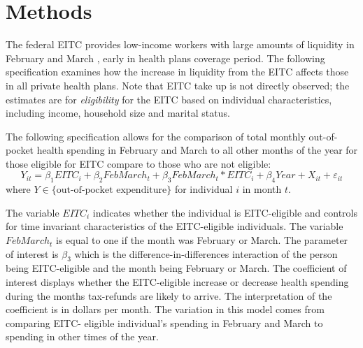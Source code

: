 \documentclass[smallcondensed,referee]{svjour3}
\begin{document}
\newpage





\FloatBarrier
\section{Methods}


\FloatBarrier
 


The federal EITC provides low-income workers with large amounts of liquidity in February and March \citep{mendenhall_role_2012, hamad_short-term_2019}, early in health plans coverage period.
 The following specification examines how the increase in liquidity from the EITC affects those in all private health plans. Note that EITC take up is not directly observed; the estimates are for \textit{eligibility} for the EITC based on individual characteristics, including income, household size and marital status. 

The following specification allows for the comparison of total monthly out-of-pocket health spending  in February and March to all other months of the year for those eligible for EITC compare to those who are not eligible:
\begin{equation}
Y_{it} =  \beta_{1}EITC_{i} +\beta_{2}FebMarch_{t} +\beta_{3}FebMarch_{t}*EITC_{i} + 
 \beta_{4}Year + X_{it}+\varepsilon_{it}  \label{eq:1} 
\end{equation}
where $Y \in \{\text{out-of-pocket expenditure}\}$ for individual $i$ in month $t$.



The variable $EITC_{i}$ indicates whether the individual is EITC-eligible and controls for time invariant characteristics of the EITC-eligible individuals. The variable $FebMarch_{t}$ is equal to one if the month was February or March. The parameter of interest is $\beta_{3}$ which is the difference-in-differences  interaction of the person being EITC-eligible and the month being February or March. The coefficient of interest displays whether the EITC-eligible increase or decrease health spending during the months tax-refunds are likely to arrive. The interpretation of the coefficient is in dollars per month. The variation in this model comes from comparing EITC- eligible individual's spending in February and March to spending in other times of the year. 
\end{document}
